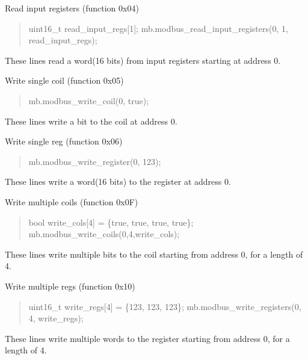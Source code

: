 Read input registers (function 0x04) \begin{quote}
uint16\+\_\+t read\+\_\+input\+\_\+regs\mbox{[}1\mbox{]}; mb.\+modbus\+\_\+read\+\_\+input\+\_\+registers(0, 1, read\+\_\+input\+\_\+regs); \end{quote}
These lines read a word(16 bits) from input registers starting at address 0.

Write single coil (function 0x05) \begin{quote}
mb.\+modbus\+\_\+write\+\_\+coil(0, true); \end{quote}
These lines write a bit to the coil at address 0.

Write single reg (function 0x06) \begin{quote}
mb.\+modbus\+\_\+write\+\_\+register(0, 123); \end{quote}
These lines write a word(16 bits) to the register at address 0.

Write multiple coils (function 0x0F) \begin{quote}
bool write\+\_\+cols\mbox{[}4\mbox{]} = \{true, true, true, true\}; mb.\+modbus\+\_\+write\+\_\+coils(0,4,write\+\_\+cols); \end{quote}
These lines write multiple bits to the coil starting from address 0, for a length of 4.

Write multiple regs (function 0x10) \begin{quote}
uint16\+\_\+t write\+\_\+regs\mbox{[}4\mbox{]} = \{123, 123, 123\}; mb.\+modbus\+\_\+write\+\_\+registers(0, 4, write\+\_\+regs); \end{quote}
These lines write multiple words to the register starting from address 0, for a length of 4. 
